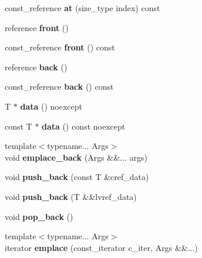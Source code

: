 \begin{DoxyCompactItemize}
const\+\_\+reference {\bfseries at} (size\+\_\+type index) const
\item 
\mbox{\label{classsc2d_1_1vec_aa5b1ea957bc93492631dd36030aee3da}} 
reference {\bfseries front} ()
\item 
\mbox{\label{classsc2d_1_1vec_a01f287663e9110eeda340ec77a3e81c0}} 
const\+\_\+reference {\bfseries front} () const
\item 
\mbox{\label{classsc2d_1_1vec_ae9888026a04841a1ea6124adb5180bd9}} 
reference {\bfseries back} ()
\item 
\mbox{\label{classsc2d_1_1vec_aff639dd01ca63e73010714aa3c7392b9}} 
const\+\_\+reference {\bfseries back} () const
\item 
\mbox{\label{classsc2d_1_1vec_a9a8ad99a5a004450a678f6fef8ac7e0c}} 
T $\ast$ {\bfseries data} () noexcept
\item 
\mbox{\label{classsc2d_1_1vec_a6d9402b5b931c48154ca5cf5f51cb922}} 
const T $\ast$ {\bfseries data} () const noexcept
\item 
\mbox{\label{classsc2d_1_1vec_aecf851156dca24530bf1593637c80eda}} 
{\footnotesize template$<$typename... Args$>$ }\\void {\bfseries emplace\+\_\+back} (Args \&\&... args)
\item 
\mbox{\label{classsc2d_1_1vec_a88916af1bddbe758af2ec38a557a0372}} 
void {\bfseries push\+\_\+back} (const T \&cref\+\_\+data)
\item 
\mbox{\label{classsc2d_1_1vec_a3ffa00b8c4fd29c80da1032bf3245d72}} 
void {\bfseries push\+\_\+back} (T \&\&lvref\+\_\+data)
\item 
\mbox{\label{classsc2d_1_1vec_a4a8286863d21254d801e88eac0f5c805}} 
void {\bfseries pop\+\_\+back} ()
\item 
\mbox{\label{classsc2d_1_1vec_aba1b2880be5e4e5925d1534279949d65}} 
{\footnotesize template$<$typename... Args$>$ }\\iterator {\bfseries emplace} (const\+\_\+iterator c\+\_\+iter, Args \&\&...)

\end{DoxyCompactItemize}
